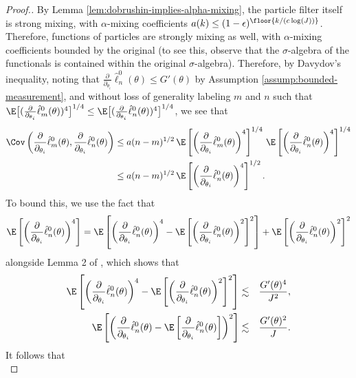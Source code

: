 \begin{proof}[Proof.]
By Lemma \ref{lem:dobrushin-implies-alpha-mixing}, the particle filter itself is strong mixing, with $\alpha$-mixing coefficients $a(k) \leq (1-\epsilon)^{\floor{k/(c\log(J))}}$. Therefore, functions of particles are strongly mixing as well, with $\alpha$-mixing coefficients bounded by the original (to see this, observe that the $\sigma$-algebra of the functionals is contained within the original $\sigma$-algebra). Therefore, by Davydov's inequality, noting that $\frac{\partial}{\partial_{\theta_i}}\hat\ell_n^0(\theta)\leq G'(\theta)$ by Assumption \ref{assump:bounded-measurement}, and without loss of generality labeling $m$ and $n$ such that $\E\big[(\frac{\partial}{\partial_{\theta_i}}\hat\ell_m^0(\theta))^4\big]^{1/4}\leq\E\big[(\frac{\partial}{\partial_{\theta_i}}\hat\ell_n^0(\theta))^4\big]^{1/4}$, we see that
\begin{align}
    \Cov\left(\frac{\partial}{\partial_{\theta_i}}\hat\ell_m^0(\theta), \frac{\partial}{\partial_{\theta_i}}\hat\ell_n^0(\theta)\right) 
    &\leq a(n-m)^{1/2} \, \E\left[\left(\frac{\partial}{\partial_{\theta_i}}\hat\ell_m^0(\theta)\right)^4\right]^{1/4}
    \,
    \E\left[\left(\frac{\partial}{\partial_{\theta_i}}\hat\ell_n^0(\theta)\right)^4\right]^{1/4}\\
    &\leq a(n-m)^{1/2}\, \E\left[\left(\frac{\partial}{\partial_{\theta_i}}\hat\ell_n^0(\theta)\right)^4\right]^{1/2}.
\end{align}
To bound this, we use the fact that 
\begin{equation}
\E\left[\left(\frac{\partial}{\partial_{\theta_i}}\hat\ell_n^0(\theta)\right)^4\right] = \E\left[\left(\frac{\partial}{\partial_{\theta_i}}\hat\ell_n^0(\theta)\right)^4-\E\left[\left(\frac{\partial}{\partial_{\theta_i}}\hat\ell_n^0(\theta)\right)^2\right]^2\right]+\E\left[\left(\frac{\partial}{\partial_{\theta_i}}\hat\ell_n^0(\theta)\right)^2\right]^2
\end{equation}
alongside Lemma 2 of \cite{karjalainen23}, which shows that
\begin{eqnarray}
\E\left[\left(\frac{\partial}{\partial_{\theta_i}}\hat\ell_n^0(\theta)\right)^4-\E\left[\left(\frac{\partial}{\partial_{\theta_i}}\hat\ell_n^0(\theta)\right)^2\right]^2\right] &\lesssim& \frac{G'(\theta)^4}{J^2}, 
\\
\E\left[\left(\frac{\partial}{\partial_{\theta_i}}\hat\ell_n^0(\theta)-\E\left[\frac{\partial}{\partial_{\theta_i}}\hat\ell_n^0(\theta)\right]\right)^2\right] &\lesssim& \frac{G'(\theta)^2}{J}.
\end{eqnarray}
It follows that 
\begin{equation}

\end{equation}
\end{proof}
